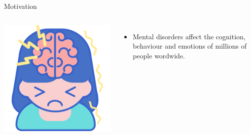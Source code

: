 \documentclass[spanish, aspectratio=169]{beamer}
\begin{document}
	
	
\frame{\titlepage}

\begin{frame}{Motivation}
\begin{columns}
	\centering
	\includegraphics[scale=0.3]{figures/metal_disorders.png}
	
	
	\begin{itemize}
		\item Mental disorders affect the cognition, behaviour and emotions of millions of people wordwide.
	\end{itemize}
	
\end{columns}
\end{frame}	
	
	
\end{document}
